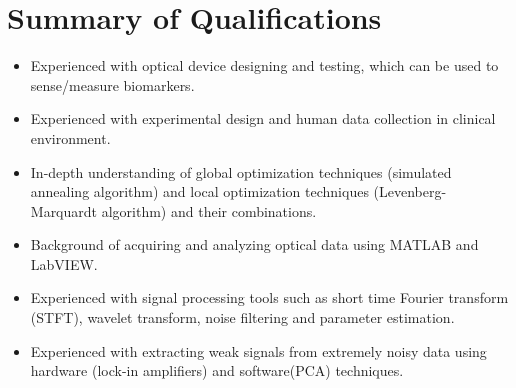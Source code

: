 \documentclass{my_cv}
\begin{document}
\vspace{-2mm}
\begin{center} 
\begin{footnotesize}
\end{footnotesize}

\href{https://www.linkedin.com/in/venkaiahchowdarykavuri}{\faLinkedinSquare} \href{https://github.com/Venki-Kavuri}{\faGithub} \href{https://scholar.google.com/citations?hl=en&user=r5E9ACIAAAAJ&view_op=list_works}{\aiGoogleScholar} \href{https://www.facebook.com/venki.kavuri}{\faFacebookOfficial}
\end{center} 

\vspace{-9mm} 

\section{Summary of Qualifications}
\begin{itemize}\itemsep 0pt

\item Experienced with optical device designing and testing, which can be used to sense/measure biomarkers.

\item Experienced with experimental design and human data collection in clinical environment. 

\item In-depth understanding of global optimization techniques (simulated annealing algorithm) and local optimization techniques (Levenberg-Marquardt algorithm) and their combinations.

\item Background of acquiring and analyzing optical data using MATLAB and LabVIEW.

\item Experienced with signal processing tools such as short time Fourier transform (STFT), wavelet transform, noise filtering and parameter estimation.

\item Experienced with extracting weak signals from extremely noisy data using hardware (lock-in amplifiers) and software(PCA) techniques.    


\end{itemize}
\vspace{-7mm}
\end{document}

